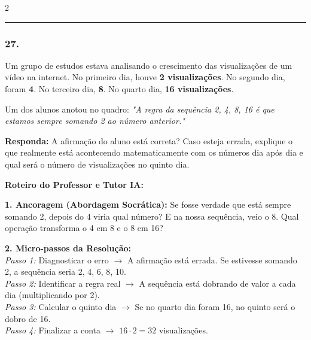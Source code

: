 \begin{multicols*}{2}
\par\vspace{\espacoQuestao}

\noindent\textcolor{CorLinha}{\rule{\linewidth}{0.5pt}}
\par\vspace{\espacoPreQuestao}
\subsubsection*{27.} 
\begin{enunciadoLiteral}
Um grupo de estudos estava analisando o crescimento das visualizações de um vídeo na internet. No primeiro dia, houve \textbf{2 visualizações}. No segundo dia, foram \textbf{4}. No terceiro dia, \textbf{8}. No quarto dia, \textbf{16 visualizações}.

Um dos alunos anotou no quadro: \textit{"A regra da sequência 2, 4, 8, 16 é que estamos sempre somando 2 ao número anterior."}

\begin{boxresponda}
\textbf{Responda:} A afirmação do aluno está correta? Caso esteja errada, explique o que realmente está acontecendo matematicamente com os números dia após dia e qual será o número de visualizações no quinto dia.
\end{boxresponda}
\end{enunciadoLiteral}

\ifgabarito
    \begin{tcolorbox}[colback=CorTitUm!5, colframe=CorTitUm, boxrule=1pt, arc=4pt, left=6pt, right=6pt, top=6pt, bottom=6pt]
    \small\textbf{\textcolor{CorTitUm}{Roteiro do Professor e Tutor IA:}}\par\vspace{0.1cm}
    \color{CinzaEscuro}
    \textbf{1. Ancoragem (Abordagem Socrática):} Se fosse verdade que está sempre somando 2, depois do 4 viria qual número? E na nossa sequência, veio o 8. Qual operação transforma o 4 em 8 e o 8 em 16?\par\vspace{0.1cm}
    
    \textbf{2. Micro-passos da Resolução:}\\
    \textit{Passo 1:} Diagnosticar o erro $\rightarrow$ A afirmação está errada. Se estivesse somando 2, a sequência seria 2, 4, 6, 8, 10.\\
    \textit{Passo 2:} Identificar a regra real $\rightarrow$ A sequência está dobrando de valor a cada dia (multiplicando por 2).\\
    \textit{Passo 3:} Calcular o quinto dia $\rightarrow$ Se no quarto dia foram 16, no quinto será o dobro de 16.\\
    \textit{Passo 4:} Finalizar a conta $\rightarrow$ $ 16 \cdot 2 = 32 $ visualizações.\par\vspace{0.1cm}
    

\end{tcolorbox}
\end{multicols*}
